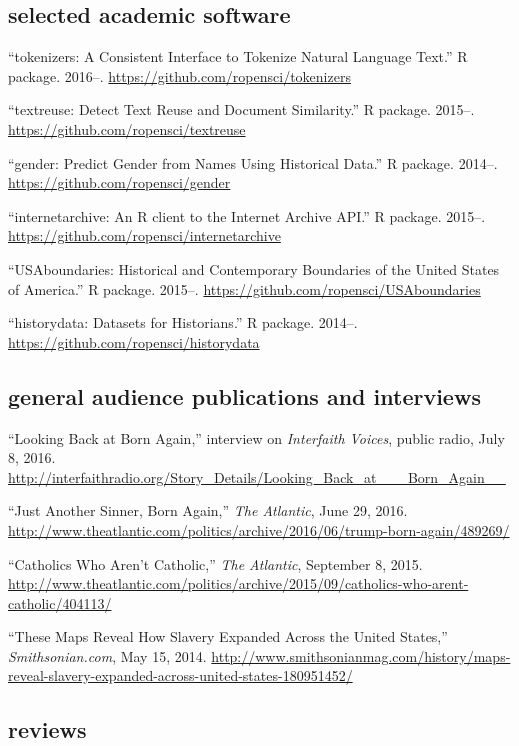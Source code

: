 \documentclass[11pt]{article}
\begin{document}
\subsection{selected academic software}\label{academic-software}

``tokenizers: A Consistent Interface to Tokenize Natural Language Text.'' R 
package. 2016--. \url{https://github.com/ropensci/tokenizers}

``textreuse: Detect Text Reuse and Document Similarity.'' R package. 2015--. 
\url{https://github.com/ropensci/textreuse}

``gender: Predict Gender from Names Using Historical Data.'' R package. 
2014--. \url{https://github.com/ropensci/gender}

``internetarchive: An R client to the Internet Archive API.'' R package.  
2015--. \url{https://github.com/ropensci/internetarchive}

``USAboundaries: Historical and Contemporary Boundaries of the United States 
of America.'' R package.  2015--.  
\url{https://github.com/ropensci/USAboundaries}

``historydata: Datasets for Historians.'' R package. 2014--.  
\url{https://github.com/ropensci/historydata}


\subsection{general audience publications and interviews}\label{public}

``Looking Back at Born Again,'' interview on \emph{Interfaith Voices}, public 
radio, July 8, 2016.  
\url{http://interfaithradio.org/Story_Details/Looking_Back_at___Born_Again__}

``Just Another Sinner, Born Again,'' \emph{The Atlantic}, June 29, 2016. 
\url{http://www.theatlantic.com/politics/archive/2016/06/trump-born-again/489269/}

``Catholics Who Aren't Catholic,'' \emph{The Atlantic}, September 8, 
2015.  
\url{http://www.theatlantic.com/politics/archive/2015/09/catholics-who-arent-catholic/404113/}

``These Maps Reveal How Slavery Expanded Across the United States,''
\emph{Smithsonian.com}, May 15, 2014. 
\url{http://www.smithsonianmag.com/history/maps-reveal-slavery-expanded-across-united-states-180951452/}

\subsection{reviews}\label{book-reviews}
\end{document}
